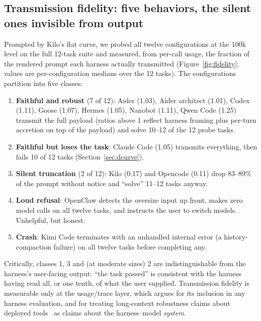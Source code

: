 \documentclass[11pt]{article}
\newcommand{\harness}[1]{\textsf{#1}}
\begin{document}
\subsection{Transmission fidelity: five behaviors, the silent ones invisible from output}
\label{sec:fidelity}

Prompted by Kilo's flat curve, we probed all twelve configurations at the 100k level on the full 12-task suite and measured, from per-call usage, the fraction of the rendered prompt each harness actually transmitted (Figure~\ref{fig:fidelity}; values are per-configuration medians over the 12 tasks). The configurations partition into five classes:

\begin{enumerate}
  \item \textbf{Faithful and robust} (7 of 12): \harness{Aider} (1.03), \harness{Aider} architect (1.01), \harness{Codex} (1.11), \harness{Goose} (1.07), \harness{Hermes} (1.05), \harness{Nanobot} (1.11), \harness{Qwen Code} (1.25) transmit the full payload (ratios above 1 reflect harness framing plus per-turn accretion on top of the payload) and solve 10--12 of the 12 probe tasks.
  \item \textbf{Faithful but loses the task}: \harness{Claude Code} (1.05) transmits everything, then fails 10 of 12 tasks (Section~\ref{sec:dcurve}).
  \item \textbf{Silent truncation} (2 of 12): \harness{Kilo} (0.17) and \harness{Opencode} (0.11) drop 83--89\% of the prompt without notice and ``solve'' 11--12 tasks anyway.
  \item \textbf{Loud refusal}: \harness{OpenClaw} detects the oversize input up front, makes zero model calls on all twelve tasks, and instructs the user to switch models. Unhelpful, but honest.
  \item \textbf{Crash}: \harness{Kimi Code} terminates with an unhandled internal error (a history-compaction failure) on all twelve tasks before completing any.
\end{enumerate}

Critically, classes 1, 3 and (at moderate sizes) 2 are indistinguishable from the harness's user-facing output: ``the task passed'' is consistent with the harness having read all, or one tenth, of what the user supplied. Transmission fidelity is measurable only at the usage/trace layer, which argues for its inclusion in any harness evaluation, and for treating long-context robustness claims about deployed tools~\citep{hsieh2024ruler} as claims about the harness--model \emph{system}.
\end{document}

